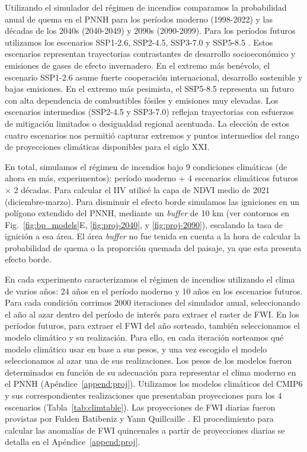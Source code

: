 Utilizando el simulador del régimen de incendios comparamos la probabilidad anual de quema en el PNNH para los períodos moderno (1998-2022) y las décadas de los 2040s (2040-2049) y 2090s (2090-2099). Para los períodos futuros utilizamos los escenarios SSP1-2.6, SSP2-4.5, SSP3-7.0 y SSP5-8.5 \citep{IPCC2023}. Estos escenarios representan trayectorias contrastantes de desarrollo socioeconómico y emisiones de gases de efecto invernadero. En el extremo más benévolo, el escenario SSP1-2.6 asume fuerte cooperación internacional, desarrollo sostenible y bajas emisiones. En el extremo más pesimista, el SSP5-8.5 representa un futuro con alta dependencia de combustibles fósiles y emisiones muy elevadas. Los escenarios intermedios (SSP2-4.5 y SSP3-7.0) reflejan trayectorias con esfuerzos de mitigación limitados o desigualdad regional acentuada. La elección de estos cuatro escenarios nos permitió capturar extremos y puntos intermedios del rango de proyecciones climáticas disponibles para el siglo XXI.

En total, simulamos el régimen de incendios bajo 9 condiciones climáticas (de ahora en más, experimentos): período moderno + 4 escenarios climáticos futuros $\times$ 2 décadas. Para calcular el IIV utilicé la capa de NDVI medio de 2021 (diciembre-marzo). Para disminuir el efecto borde simulamos las igniciones en un polígono extendido del PNNH, mediante un \textit{buffer} de 10 km (ver contornos en Fig.~\ref{fig:bp_models}E, \ref{fig:proj-2040}, y \ref{fig:proj-2090}), escalando la tasa de ignición a esa área. El área \textit{buffer} no fue tenida en cuenta a la hora de calcular la probabilidad de quema o la proporción quemada del paisaje, ya que esta presenta efecto borde.

En cada experimento caracterizamos el régimen de incendios utilizando el clima de varios años: 24 años en el período moderno y 10 años en los escenarios futuros. Para cada condición corrimos 2000 iteraciones del simulador anual, seleccionando el año al azar dentro del período de interés para extraer el raster de FWI. En los períodos futuros, para extraer el FWI del año sorteado, también seleccionamos el modelo climático y su realización. Para ello, en cada iteración sorteamos qué modelo climático usar en base a sus pesos, y una vez escogido el modelo seleccionamos al azar una de sus realizaciones. Los pesos de los modelos fueron determinados en función de su adecuación para representar el clima moderno en el PNNH (Apéndice~\ref{append:proj}). Utilizamos los modelos climáticos del CMIP6 y sus correspondientes realizaciones que presentaban proyecciones para los 4 escenarios (Tabla~\ref{tab:climtable}). Las proyecciones de FWI diarias fueron provistas por Fulden Batibeniz y Yann Quillcaille \citep{quilcaille2023FWI}. El procedimiento para calcular las anomalías de FWI quincenales a partir de proyecciones diarias se detalla en el Apéndice~\ref{append:proj}. 

